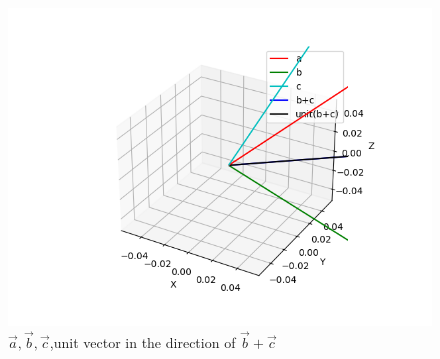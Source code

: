 \documentclass[journal]{IEEEtran}
\numberwithin{figure}{enumi}
\begin{document}
\begin{figure}[h!]
	\centering
	\includegraphics[width=0.5\linewidth]{figs/Figure_1.png}
	\caption{ $\vec{a},\vec{b},\vec{c}$,unit vector in the direction of  $\vec{b}+\vec{c}$}
	\label{stemplot}
\end{figure}	
\end{document}
